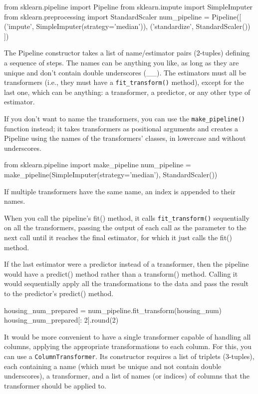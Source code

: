 \begin{pyc}
from sklearn.pipeline import Pipeline
from sklearn.impute import SimpleImputer
from sklearn.preprocessing import StandardScaler
num_pipeline = Pipeline([
    ('impute', SimpleImputer(strategy='median')),
    ('standardize', StandardScaler())
])
\end{pyc}

The Pipeline constructor takes a list of name/estimator pairs (2-tuples) defining a sequence of steps. The names can be anything you like, as long as they are unique and don't contain double underscores (\_\_). The estimators must all be transformers (i.e., they must have a \verb|fit_transform()| method), except for the last one, which can be anything: a transformer, a predictor, or any other type of estimator.

If you don't want to name the transformers, you can use the \verb|make_pipeline()| function instead; it takes transformers as positional arguments and creates a Pipeline using the names of the transformers' classes, in lowercase and without underscores.

\begin{pyc}
from sklearn.pipeline import make_pipeline
num_pipeline = make_pipeline(SimpleImputer(strategy='median'), StandardScaler())
\end{pyc}

If multiple transformers have the same name, an index is appended to their names.

When you call the pipeline's fit() method, it calls \verb|fit_transform()| sequentially on
all the transformers, passing the output of each call as the parameter to the next call
until it reaches the final estimator, for which it just calls the fit() method.

If the last estimator were a predictor instead
of a transformer, then the pipeline would have a predict() method rather than a
transform() method. Calling it would sequentially apply all the transformations to
the data and pass the result to the predictor's predict() method.

\begin{pyc}
housing_num_prepared = num_pipeline.fit_transform(housing_num)
housing_num_prepared[: 2].round(2)
\end{pyc}

It would be more convenient to have a single transformer capable of handling
all columns, applying the appropriate transformations to each column. For this,
you can use a \verb|ColumnTransformer|.  Its constructor requires a list of
triplets (3-tuples), each containing a name (which must be unique and not contain
double underscores), a transformer, and a list of names (or indices) of columns that
the transformer should be applied to.

